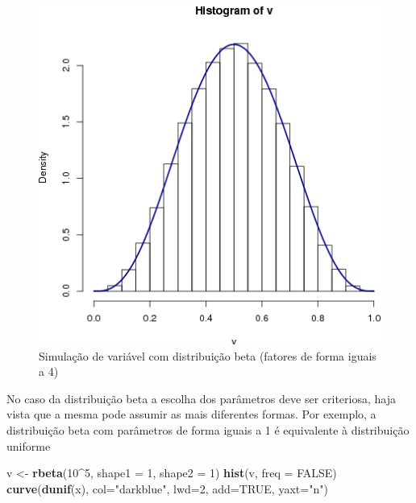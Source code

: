 \documentclass[a4paper]{article}
\newenvironment{Shaded}{\begin{snugshade}}{\end{snugshade}}
\newcommand{\KeywordTok}[1]{\textcolor[rgb]{0.13,0.29,0.53}{\textbf{#1}}}
\newcommand{\DataTypeTok}[1]{\textcolor[rgb]{0.13,0.29,0.53}{#1}}
\newcommand{\DecValTok}[1]{\textcolor[rgb]{0.00,0.00,0.81}{#1}}
\newcommand{\StringTok}[1]{\textcolor[rgb]{0.31,0.60,0.02}{#1}}
\newcommand{\OtherTok}[1]{\textcolor[rgb]{0.56,0.35,0.01}{#1}}
\newcommand{\OperatorTok}[1]{\textcolor[rgb]{0.81,0.36,0.00}{\textbf{#1}}}
\newcommand{\NormalTok}[1]{#1}
\begin{document}
\begin{figure}[H]

{\centering \includegraphics[width=0.7\linewidth]{images/rbeta1-1} 

}

\caption{Simulação de variável com distribuição beta (fatores de forma iguais a 4)}\label{fig:rbeta1}
\end{figure}

No caso da distribuição beta a escolha dos parâmetros deve ser
criteriosa, haja vista que a mesma pode assumir as mais diferentes
formas. Por exemplo, a distribuição beta com parâmetros de forma iguais
a 1 é equivalente à distribuição uniforme

\begin{Shaded}
\begin{Highlighting}[]
\NormalTok{v <-}\StringTok{ }\KeywordTok{rbeta}\NormalTok{(}\DecValTok{10}\OperatorTok{^}\DecValTok{5}\NormalTok{, }\DataTypeTok{shape1 =} \DecValTok{1}\NormalTok{, }\DataTypeTok{shape2 =} \DecValTok{1}\NormalTok{)}
\KeywordTok{hist}\NormalTok{(v, }\DataTypeTok{freq =} \OtherTok{FALSE}\NormalTok{)}
\KeywordTok{curve}\NormalTok{(}\KeywordTok{dunif}\NormalTok{(x),}
          \DataTypeTok{col=}\StringTok{"darkblue"}\NormalTok{, }\DataTypeTok{lwd=}\DecValTok{2}\NormalTok{, }\DataTypeTok{add=}\OtherTok{TRUE}\NormalTok{, }\DataTypeTok{yaxt=}\StringTok{"n"}\NormalTok{)}
\end{Highlighting}
\end{Shaded}
\end{document}
